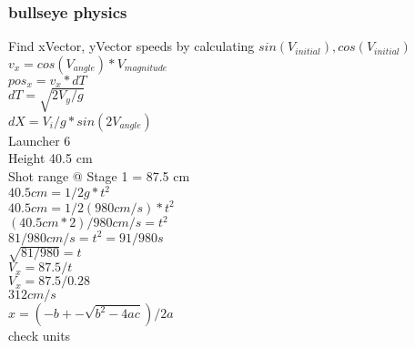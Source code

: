 \documentclass{article}
\begin{document}
\subsubsection* {bullseye physics}
Find xVector, yVector speeds by calculating $sin(V_{initial}), cos(V_{initial})$\\
$v_x = cos(V_{angle}) * V_{magnitude}$\\
$pos_x = v_x * dT$\\
$dT = \sqrt{2V_y/g}$\\
$dX = V_i/g * sin(2V_{angle})$\\
Launcher 6
\\Height 40.5 cm
\\Shot range @ Stage 1 = 87.5 cm
\\$40.5 cm = 1/2 g * t ^2$
\\$40.5 cm = 1/2 (980 cm/s) * t^2$
\\$(40.5cm * 2 )/980cm/s = t^2$
\\$81/980cm/s = t^2 = 91/980s$
\\$ \sqrt{81/980} = t$
\\$V_x = 87.5/t$
\\$V_x = 87.5/0.28$
\\$312 cm/s$
\\$x=({-b+-\sqrt{b^2-4ac}})/2a$
\\check units
\end{document}

